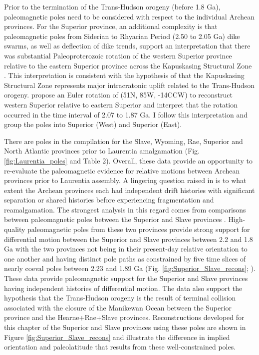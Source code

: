 \documentclass[twocolumn, switch]{article} %
\begin{document}
Prior to the termination of the Trans-Hudson orogeny (before 1.8 Ga), paleomagnetic poles need to be considered with respect to the individual Archean provinces. For the Superior province, an additional complexity is that paleomagnetic poles from Siderian to Rhyacian Period (2.50 to 2.05 Ga) dike swarms, as well as deflection of dike trends, support an interpretation that there was substantial Paleoproterozoic rotation of the western Superior province relative to the eastern Superior province across the Kapuskasing Structural Zone \citep{Bates1991a, Evans2010a}. This interpretation is consistent with the hypothesis of \citet{Hoffman1988a} that the Kapuskasing Structural Zone represents major intracratonic uplift related to the Trans-Hudson orogeny. \cite{Evans2010a} propose an Euler rotation of (51\textdegree N, 85\textdegree W, -14\textdegree CCW) to reconstruct western Superior relative to eastern Superior and interpret that the rotation occurred in the time interval of 2.07 to 1.87 Ga.  I follow this interpretation and group the poles into Superior (West) and Superior (East).

There are poles in the compilation for the Slave, Wyoming, Rae, Superior and North Atlantic provinces prior to Laurentia amalgamation (Fig. \ref{fig:Laurentia_poles} and Table 2). Overall, these data provide an opportunity to re-evaluate the paleomagnetic evidence for relative motions between Archean provinces prior to Laurentia assembly. A lingering question raised in \citet{Hoffman1988a} is to what extent the Archean provinces each had independent drift histories with significant separation or shared histories before experiencing fragmentation and reamalgamation. The strongest analysis in this regard comes from comparisons between paleomagnetic poles between the Superior and Slave provinces \citep{Buchan2009a, Mitchell2014a, Buchan2016a}. High-quality paleomagnetic poles from these two provinces provide strong support for differential motion between the Superior and Slave provinces between 2.2 and 1.8 Ga with the two provinces not being in their present-day relative orientation to one another and having distinct pole paths as constrained by five time slices of nearly coeval poles between 2.23 and 1.89 Ga (Fig. \ref{fig:Superior_Slave_recons}; \citealp{Buchan2016a}). These data provide paleomagnetic support for the Superior and Slave provinces having independent histories of differential motion. The data also support the hypothesis that the Trans-Hudson orogeny is the result of terminal collision associated with the closure of the Manikewan Ocean between the Superior province and the Hearne+Rae+Slave provinces. Reconstructions developed for this chapter of the Superior and Slave provinces using these poles are shown in Figure \ref{fig:Superior_Slave_recons} and illustrate the difference in implied orientation and paleolatitude that results from these well-constrained poles.
\end{document}
